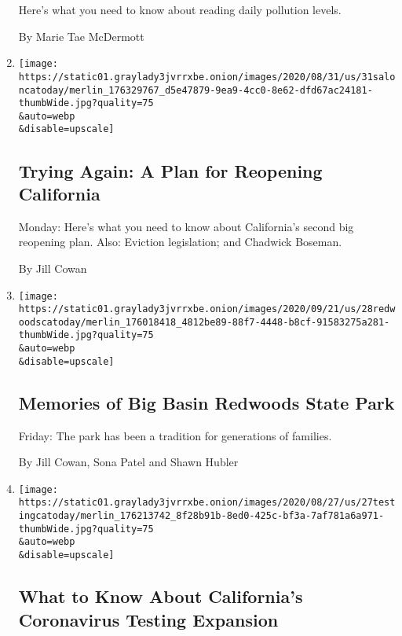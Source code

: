 \begin{enumerate}
  Here's what you need to know about reading daily pollution levels.

  By Marie Tae McDermott
\item
  \href{/2020/08/31/us/california-coronavirus-reopening.html}{}

  \texttt{[image: https://static01.graylady3jvrrxbe.onion/images/2020/08/31/us/31saloncatoday/merlin\_176329767\_d5e47879-9ea9-4cc0-8e62-dfd67ac24181-thumbWide.jpg?quality=75\\\&auto=webp\\\&disable=upscale]}

  \hypertarget{trying-again-a-plan-for-reopening-california}{%
  \subsection{Trying Again: A Plan for Reopening
  California}\label{trying-again-a-plan-for-reopening-california}}

  Monday: Here's what you need to know about California's second big
  reopening plan. Also: Eviction legislation; and Chadwick Boseman.

  By Jill Cowan
\item
  \href{/2020/08/28/us/california-fires-big-basin-redwoods.html}{}

  \texttt{[image: https://static01.graylady3jvrrxbe.onion/images/2020/09/21/us/28redwoodscatoday/merlin\_176018418\_4812be89-88f7-4448-b8cf-91583275a281-thumbWide.jpg?quality=75\\\&auto=webp\\\&disable=upscale]}

  \hypertarget{memories-of-big-basin-redwoods-state-park}{%
  \subsection{Memories of Big Basin Redwoods State
  Park}\label{memories-of-big-basin-redwoods-state-park}}

  Friday: The park has been a tradition for generations of families.

  By Jill Cowan, Sona Patel and Shawn Hubler
\item
  \href{/2020/08/27/us/ca-covid-testing.html}{}

  \texttt{[image: https://static01.graylady3jvrrxbe.onion/images/2020/08/27/us/27testingcatoday/merlin\_176213742\_8f28b91b-8ed0-425c-bf3a-7af781a6a971-thumbWide.jpg?quality=75\\\&auto=webp\\\&disable=upscale]}

  \hypertarget{what-to-know-about-californias-coronavirus-testing-expansion}{%
  \subsection{What to Know About California's Coronavirus Testing
  Expansion}\label{what-to-know-about-californias-coronavirus-testing-expansion}}


\end{enumerate}

